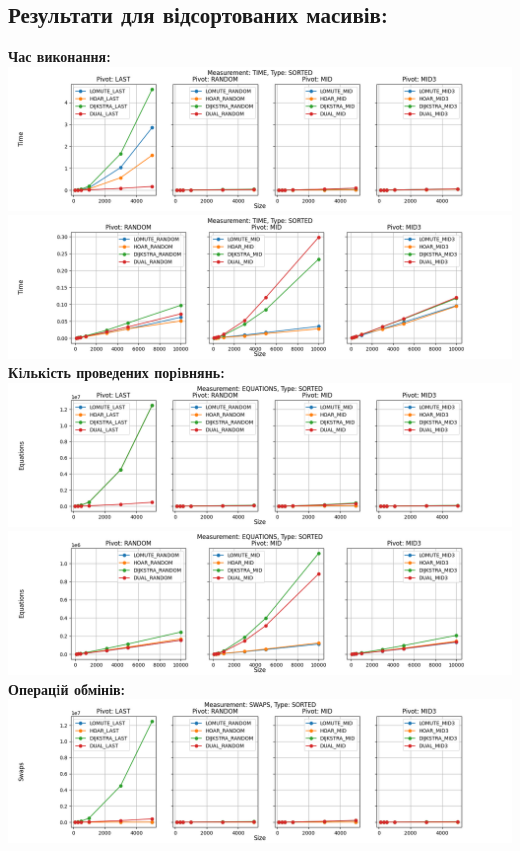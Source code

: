 \documentclass{article}
\begin{document}
    \subsection{Результати для відсортованих масивів:}
    \textbf{Час виконання:}
    \newline
        \includegraphics[scale=0.5]{sorted_Time_6_numbers.png}
        \includegraphics[scale=0.5]{sorted_Time_3_pivots_7_numbers.png}
    \textbf{Кiлькiсть проведених порiвнянь:}
    \newline
        \includegraphics[scale=0.5]{sorted_Equations_6_numbers.png}
        \includegraphics[scale=0.5]{sorted_Equations_3_pivots_7_numbers.png}
        \newline
    \textbf{Операцiй обмінів:}
    \newline
        \includegraphics[scale=0.5]{sorted_Swaps_6_numbers.png}
\end{document}
